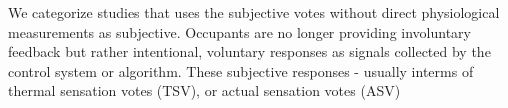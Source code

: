 
We categorize studies that uses the subjective votes without direct physiological measurements as subjective. Occupants are no longer providing involuntary feedback but rather intentional, voluntary responses as signals collected by the control system or algorithm. These subjective responses - usually interms of thermal sensation votes (TSV), or actual sensation votes (ASV)


